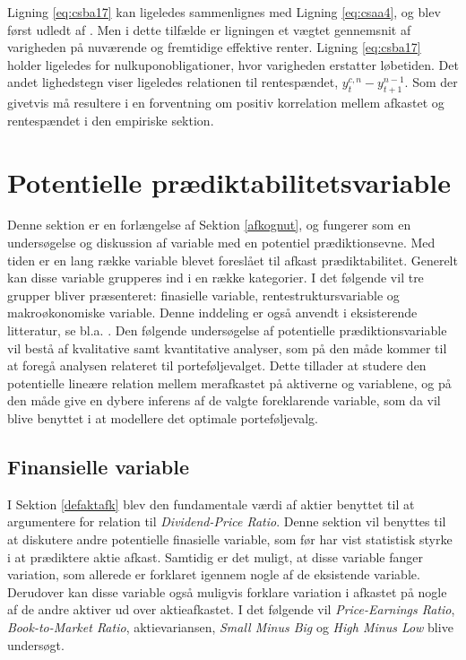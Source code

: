 \documentclass[
  a4paper,
  oneside]{memoir}
\begin{document}
Ligning \eqref{eq:csba17} kan ligeledes sammenlignes med Ligning \eqref{eq:csaa4}, og blev først udledt af \citep{Campbell1983}. Men i dette tilfælde er ligningen et vægtet gennemsnit af varigheden på nuværende og fremtidige effektive renter. Ligning \eqref{eq:csba17} holder ligeledes for nulkuponobligationer, hvor varigheden erstatter løbetiden. Det andet lighedstegn viser ligeledes relationen til rentespændet, \(y_t^{c,n}- y_{t+1}^{n-1}\). Som der givetvis må resultere i en forventning om positiv korrelation mellem afkastet og rentespændet i den empiriske sektion.

\hypertarget{potpradik}{%
\section{Potentielle prædiktabilitetsvariable}\label{potpradik}}

Denne sektion er en forlængelse af Sektion \ref{afkognut}, og fungerer som en undersøgelse og diskussion af variable med en potentiel prædiktionsevne. Med tiden er en lang række variable blevet foreslået til afkast prædiktabilitet. Generelt kan disse variable grupperes ind i en række kategorier. I det følgende vil tre grupper bliver præsenteret: finasielle variable, rentestruktursvariable og makroøkonomiske variable. Denne inddeling er også anvendt i eksisterende litteratur, se bl.a. \citep{Koijen2011}. Den følgende undersøgelse af potentielle prædiktionsvariable vil bestå af kvalitative samt kvantitative analyser, som på den måde kommer til at foregå analysen relateret til porteføljevalget. Dette tillader at studere den potentielle lineære relation mellem merafkastet på aktiverne og variablene, og på den måde give en dybere inferens af de valgte foreklarende variable, som da vil blive benyttet i at modellere det optimale porteføljevalg.

\hypertarget{finansielle-variable}{%
\subsection{Finansielle variable}\label{finansielle-variable}}

I Sektion \ref{defaktafk} blev den fundamentale værdi af aktier benyttet til at argumentere for relation til \emph{Dividend-Price Ratio}. Denne sektion vil benyttes til at diskutere andre potentielle finasielle variable, som før har vist statistisk styrke i at prædiktere aktie afkast. Samtidig er det muligt, at disse variable fanger variation, som allerede er forklaret igennem nogle af de eksistende variable. Derudover kan disse variable også muligvis forklare variation i afkastet på nogle af de andre aktiver ud over aktieafkastet. I det følgende vil \emph{Price-Earnings Ratio}, \emph{Book-to-Market Ratio}, aktievariansen, \emph{Small Minus Big} og \emph{High Minus Low} blive undersøgt.
\end{document}
